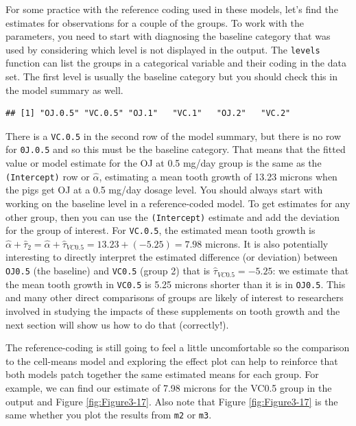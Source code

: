 \documentclass[]{book}
\newenvironment{Shaded}{\begin{snugshade}}{\end{snugshade}}
\newcommand{\KeywordTok}[1]{\textcolor[rgb]{0.13,0.29,0.53}{\textbf{#1}}}
\newcommand{\OperatorTok}[1]{\textcolor[rgb]{0.81,0.36,0.00}{\textbf{#1}}}
\newcommand{\NormalTok}[1]{#1}
\theoremstyle{definition}
\theoremstyle{definition}
\theoremstyle{remark}
\begin{document}
For some practice with the reference coding used in these models, let's
find the estimates for observations for a couple of the groups. To work
with the parameters, you need to start with diagnosing the baseline
category that was used by considering which level is not displayed in
the output. The \texttt{levels} function can list the groups in a
categorical variable and their coding in the data set. The first level
is usually the baseline category but you should check this in the model
summary as well.

\begin{Shaded}
\end{Shaded}

\begin{verbatim}
## [1] "OJ.0.5" "VC.0.5" "OJ.1"   "VC.1"   "OJ.2"   "VC.2"
\end{verbatim}

There is a \texttt{VC.0.5} in the second row of the model summary, but
there is no row for \texttt{0J.0.5} and so this must be the baseline
category. That means that the fitted value or model estimate for the OJ
at 0.5 mg/day group is the same as the \texttt{(Intercept)} row or
\(\hat{\alpha}\), estimating a mean tooth growth of 13.23 microns when
the pigs get OJ at a 0.5 mg/day dosage level. You should always start
with working on the baseline level in a reference-coded model. To get
estimates for any other group, then you can use the \texttt{(Intercept)}
estimate and add the deviation for the group of interest. For
\texttt{VC.0.5}, the estimated mean tooth growth is
\(\hat{\alpha} + \hat{\tau}_2 = \hat{\alpha} + \hat{\tau}_{VC0.5}=13.23 + (-5.25)=7.98\)
microns. It is also potentially interesting to directly interpret the
estimated difference (or deviation) between \texttt{OJ0.5} (the
baseline) and \texttt{VC0.5} (group 2) that is
\(\hat{\tau}_{VC0.5}= -5.25\): we estimate that the mean tooth growth in
\texttt{VC0.5} is 5.25 microns shorter than it is in \texttt{OJ0.5}.
This and many other direct comparisons of groups are likely of interest
to researchers involved in studying the impacts of these supplements on
tooth growth and the next section will show us how to do that
(correctly!).

The reference-coding is still going to feel a little uncomfortable so
the comparison to the cell-means model and exploring the effect plot can
help to reinforce that both models patch together the same estimated
means for each group. For example, we can find our estimate of 7.98
microns for the VC0.5 group in the output and Figure
\ref{fig:Figure3-17}. Also note that Figure \ref{fig:Figure3-17} is the
same whether you plot the results from \texttt{m2} or \texttt{m3}.
\end{document}
